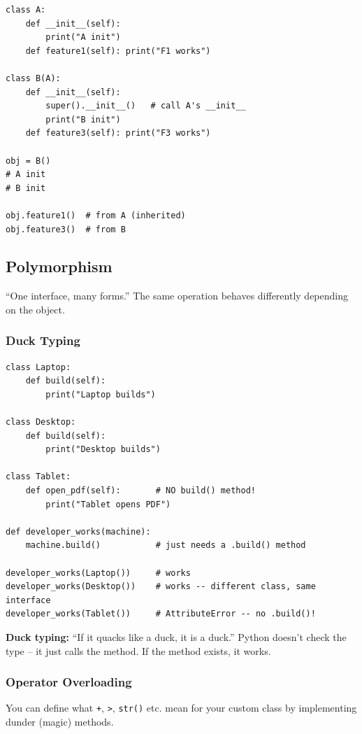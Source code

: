 \documentclass[12pt,a4paper]{article}
\newcommand{\code}[1]{\texttt{\small\color{pyblue}#1}}
\begin{document}
\begin{lstlisting}
class A:
    def __init__(self):
        print("A init")
    def feature1(self): print("F1 works")

class B(A):
    def __init__(self):
        super().__init__()   # call A's __init__
        print("B init")
    def feature3(self): print("F3 works")

obj = B()
# A init
# B init

obj.feature1()  # from A (inherited)
obj.feature3()  # from B
\end{lstlisting}

\subsection{Polymorphism}

``One interface, many forms.'' The same operation behaves differently depending on the object.

\subsubsection{Duck Typing}

\begin{lstlisting}
class Laptop:
    def build(self):
        print("Laptop builds")

class Desktop:
    def build(self):
        print("Desktop builds")

class Tablet:
    def open_pdf(self):       # NO build() method!
        print("Tablet opens PDF")

def developer_works(machine):
    machine.build()           # just needs a .build() method

developer_works(Laptop())     # works
developer_works(Desktop())    # works -- different class, same interface
developer_works(Tablet())     # AttributeError -- no .build()!
\end{lstlisting}

\begin{notebox}
\textbf{Duck typing:} ``If it quacks like a duck, it is a duck.'' Python doesn't check the type -- it just calls the method. If the method exists, it works.
\end{notebox}

\subsubsection{Operator Overloading}

You can define what \code{+}, \code{>}, \code{str()} etc. mean for your custom class by implementing dunder (magic) methods.
\end{document}

